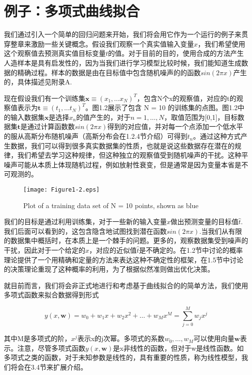 \section{例子：多项式曲线拟合}
	我们通过引入一个简单的回归问题来开始，我们将会用它作为一个运行的例子来贯穿整章来激励一些关键概念。假设我们观察一个真实值输入变量$x$，我们希望使用这个观察值去预测真实值目标变量$t$的值。对于目前的目的，使用合成的方法产生人造样本是具有启发性的，因为当我们进行学习模型比较时候，我们能知道生成数据的精确过程。样本的数据是由在目标值中包含随机噪声的的函数$sin(2 \pi x)$产生的，具体描述见附录A.

	现在假设我们有一个训练集$\mathbf{x} \equiv (x_1, \dots x_N)^T $，包含N个x的观察值，对应的t的观察值表示为$\mathbf{t} \equiv (t_1, \dots t_N)^T $。图1.2展示了包含 N = 10 的训练集的点图。图1.2中的输入数据集$\mathbf{x}$是选择$x_n$的值产生的，对于$n = 1, \dots ,N$，取值范围为[0,1]，目标数据集$\mathbf{t}$是通过计算函数数$sin(2 \pi x)$得到的对应值，并对每一个点添加一个低水平的服从高斯分布随机噪声（高斯分布会在1.2.4节介绍）可得到$t_n$。通过这种方式产生数据，我们可以得到很多真实数据集的性质，也就是说这些数据存在潜在的规律，我们希望去学习这种规律，但这种独立的观察值受到随机噪声的干扰。这种平噪声可能从本质上体现随机过程，例如放射性衰变，但是通常是因为变量本省是不可观测的。
	
\begin{figure}
	\parbox{.4\textwidth}{\caption{Plot of a training data set of N = 10 points, shown as blue}}
	\parbox{.5\textwidth}{\texttt{[image: Figure1-2.eps]}}
\end{figure}

	我们的目标是通过利用训练集，对于一些新的输入变量$\hat{x}$做出预测变量的目标值$\hat{t}$.我们后面可以看到的，这包含隐含地试图找到潜在函数$sin(2 \pi x)$.当我们从有限的数据集中概括时，在本质上是一个棘手的问题。更多的，观察数据集受到噪声的干扰，因此对于一个给定的$\hat{x}$，对应的近似值$\hat{t}$是不确定的。在1.2节中讨论的概率理论提供了一个用精确和定量的方法来表达这种不确定性的框架，在1.5节中讨论的决策理论重现了这种概率的利用，为了根据似然准则做出优化决策。
	
	就目前而言，我们将会非正式地进行和考虑基于曲线拟合的的简单方法，我们使用多项式函数来拟合数据得到形式
	
	\begin{equation}
	y(x,\mathbf{w}) = w_0 + w_1x + w_2x^2 + \dots + w_Mx^M = \sum_{j = 0}^{M}w_jx^j
	\end{equation}
	
	其中M是多项式的阶，$x^j$表示x的j次幂。多项式的系数$w_0, \dots ,w_M$可以使用向量$\mathbf{w}$表示。注意，尽管多项式函数$y(x,\mathbf{w})$是x非线性的函数，但对于w是线性函数。如多项式之类的函数，对于未知参数是线性的，具有重要的性质，称为线性模型，我们将会在3.4节来扩展介绍。
	
